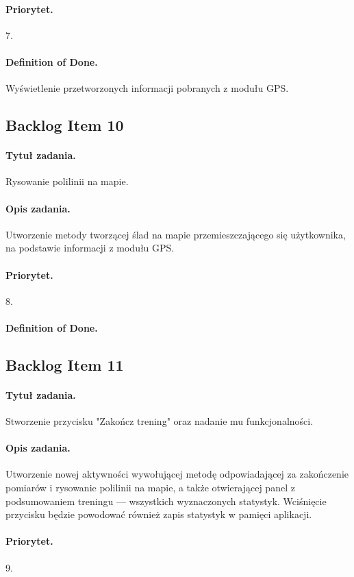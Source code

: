 \documentclass[a4paper]{article}
\begin{document}
\paragraph{Priorytet.} 7.
\paragraph{Definition of Done.} Wyświetlenie przetworzonych informacji pobranych z modułu GPS.

\subsection{Backlog Item 10}
\paragraph{Tytuł zadania.} Rysowanie polilinii na mapie.
\paragraph{Opis zadania.} Utworzenie metody tworzącej ślad na mapie przemieszczającego się użytkownika, na podstawie informacji z modułu GPS.
\paragraph{Priorytet.} 8.
\paragraph{Definition of Done.}

\subsection{Backlog Item 11}
\paragraph{Tytuł zadania.} Stworzenie przycisku "Zakończ trening" oraz nadanie mu funkcjonalności.
\paragraph{Opis zadania.} Utworzenie nowej aktywności wywołującej metodę odpowiadającej za zakończenie pomiarów i rysowanie polilinii na mapie, a także otwierającej panel z podsumowaniem treningu --- wszystkich wyznaczonych statystyk. Wciśnięcie przycisku będzie powodować również zapis statystyk w pamięci aplikacji.
\paragraph{Priorytet.} 9.
\end{document}
